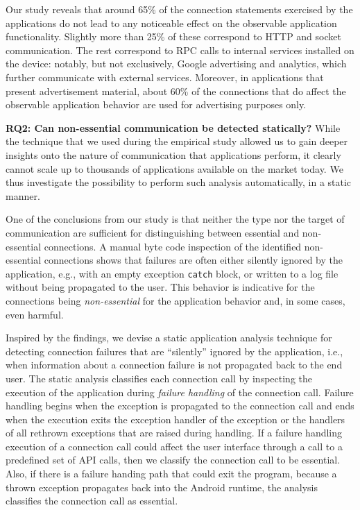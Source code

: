 Our study reveals that around 65\% of the connection statements exercised by the applications do not lead to any noticeable effect on the observable application functionality.
Slightly more than 25\% of these correspond to HTTP and socket communication. The rest correspond to RPC calls to internal services installed on the device: notably, but not exclusively, Google advertising and analytics, which further communicate with external services. 
Moreover, in applications that present advertisement material, about 60\% of the connections that do affect the observable application behavior are used for advertising purposes only.

\vspace{0.1in}
\noindent 
{\bf RQ2: Can non-essential communication be detected statically?}
While the technique that we used during the empirical study allowed us to gain deeper insights onto the nature of communication that applications perform, it clearly cannot scale up to thousands of applications available on the market today.
We thus investigate the possibility to perform such analysis automatically, in a static manner. 
 
One of the conclusions from our study is that neither the type nor the target of communication are sufficient for distinguishing between essential and non-essential connections.
A manual byte code inspection of the identified non-essential connections shows that failures are often either silently ignored by the application, e.g., with an empty exception \lstinline!catch! block, or written to a log file without being propagated to the user. 
This behavior is indicative for the connections being \emph{non-essential} for the application behavior and, in some cases, even harmful. 

Inspired by the findings, we devise a static application analysis
technique for detecting connection failures that are ``silently''
ignored by the application, i.e., when information about a connection
failure is not propagated back to the end user.  The static analysis
classifies each connection call by inspecting the execution of the
application during {\it failure handling} of the connection call.
Failure handling begins when the exception is propagated to the
connection call and ends when the execution exits the exception
handler of the exception or the handlers of all rethrown exceptions
that are raised during handling.  
If a failure handling execution of a connection call
could affect the user interface through a call to a predefined set of
API calls, then we classify the connection call to be essential.
Also, if there is a failure handing path that could exit the program,
because a thrown exception propagates back into the Android
runtime, the analysis classifies the connection call as essential.

